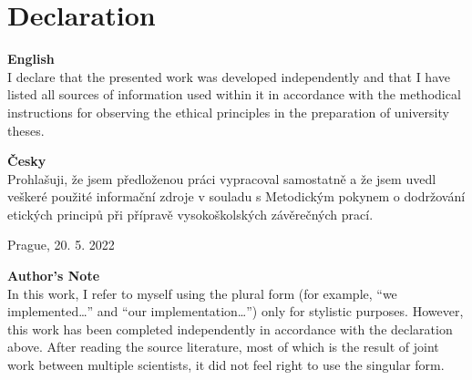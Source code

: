 \chapter*{Declaration}

{\Large\textbf{English}}\\
I declare that the presented work was developed independently and that I have
listed all sources of information used within it in accordance with the
methodical instructions for observing the ethical principles in the preparation
of university theses.

\vspace{0.5cm}
\noindent
{\Large\textbf{Česky}}\\
Prohlašuji, že jsem předloženou práci vypracoval samostatně a že jsem uvedl
veškeré použité informační zdroje v souladu s Metodickým pokynem o
dodržování etických principů při přípravě vysokoškolských závěrečných prací.

\vspace{0.5cm}
Prague, 20. 5. 2022 \hfill \underline{\hspace{5cm}}

\vspace*{\fill}
{\large\textbf{Author's Note}}\\
In this work, I refer to myself using the plural form (for example, ``we implemented\dots'' and ``our implementation\dots'') only for stylistic purposes. However, this work has been completed independently in accordance with the declaration above. After reading the source literature, most of which is the result of joint work between multiple scientists, it did not feel right to use the singular form.
